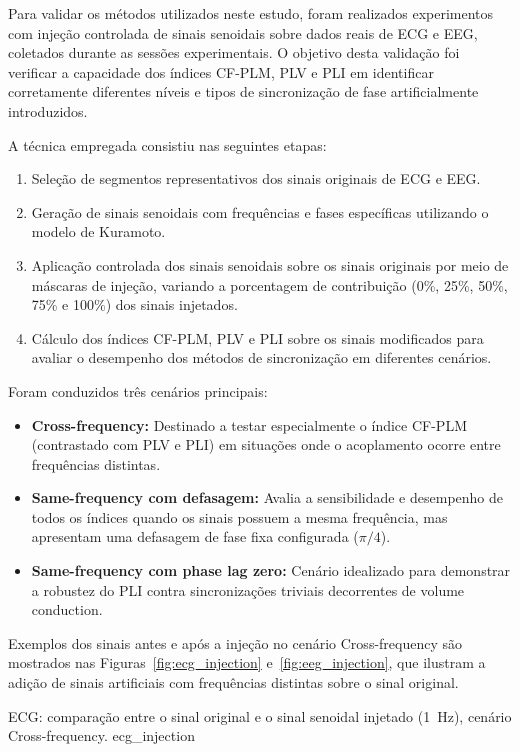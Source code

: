 \begin{itemize}
Para validar os métodos utilizados neste estudo, foram realizados experimentos com injeção controlada de sinais senoidais sobre dados reais de ECG e EEG, coletados durante as sessões experimentais. O objetivo desta validação foi verificar a capacidade dos índices CF-PLM, PLV e PLI em identificar corretamente diferentes níveis e tipos de sincronização de fase artificialmente introduzidos.

A técnica empregada consistiu nas seguintes etapas:
\begin{enumerate}
    \item Seleção de segmentos representativos dos sinais originais de ECG e EEG.
    \item Geração de sinais senoidais com frequências e fases específicas utilizando o modelo de Kuramoto.
    \item Aplicação controlada dos sinais senoidais sobre os sinais originais por meio de máscaras de injeção, variando a porcentagem de contribuição (0\%, 25\%, 50\%, 75\% e 100\%) dos sinais injetados.
    \item Cálculo dos índices CF-PLM, PLV e PLI sobre os sinais modificados para avaliar o desempenho dos métodos de sincronização em diferentes cenários.
\end{enumerate}

Foram conduzidos três cenários principais:
\begin{itemize}
    \item \textbf{Cross-frequency:} Destinado a testar especialmente o índice CF-PLM (contrastado com PLV e PLI) em situações onde o acoplamento ocorre entre frequências distintas.
    \item \textbf{Same-frequency com defasagem:} Avalia a sensibilidade e desempenho de todos os índices quando os sinais possuem a mesma frequência, mas apresentam uma defasagem de fase fixa configurada (\(\pi/4\)).
    \item \textbf{Same-frequency com phase lag zero:} Cenário idealizado para demonstrar a robustez do PLI contra sincronizações triviais decorrentes de volume conduction.
\end{itemize}

Exemplos dos sinais antes e após a injeção no cenário Cross-frequency são mostrados nas Figuras~\ref{fig:ecg_injection} e~\ref{fig:eeg_injection}, que ilustram a adição de sinais artificiais com frequências distintas sobre o sinal original.

{ECG: comparação entre o sinal original e o sinal senoidal injetado (1~Hz), cenário Cross-frequency.}
{ecg_injection}


\end{itemize}
